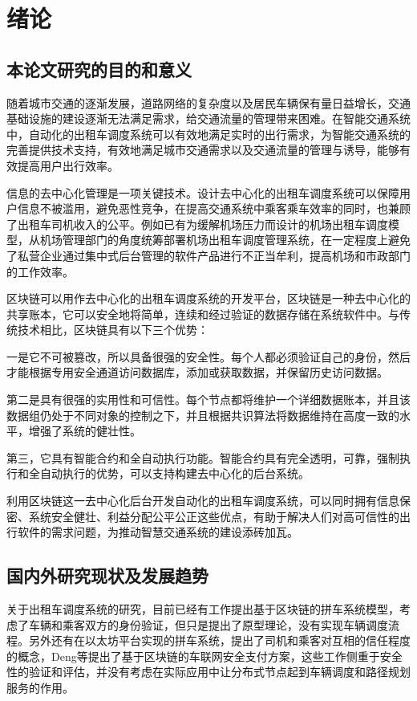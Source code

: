 \chapter{绪论}
\section{本论文研究的目的和意义}

随着城市交通的逐渐发展，道路网络的复杂度以及居民车辆保有量日益增长，交通基础设施的建设逐渐无法满足需求，给交通流量的管理带来困难。在智能交通系统中，自动化的出租车调度系统可以有效地满足实时的出行需求，为智能交通系统的完善提供技术支持，有效地满足城市交通需求以及交通流量的管理与诱导，能够有效提高用户出行效率。

信息的去中心化管理是一项关键技术。设计去中心化的出租车调度系统可以保障用户信息不被滥用，避免恶性竞争，在提高交通系统中乘客乘车效率的同时，也兼顾了出租车司机收入的公平。例如已有为缓解机场压力而设计的机场出租车调度模型，从机场管理部门的角度统筹部署机场出租车调度管理系统，在一定程度上避免了私营企业通过集中式后台管理的软件产品进行不正当牟利，提高机场和市政部门的工作效率。

区块链可以用作去中心化的出租车调度系统的开发平台，区块链是一种去中心化的共享账本，它可以安全地将简单，连续和经过验证的数据存储在系统软件中。与传统技术相比，区块链具有以下三个优势：

一是它不可被篡改，所以具备很强的安全性。每个人都必须验证自己的身份，然后才能根据专用安全通道访问数据库，添加或获取数据，并保留历史访问数据。

第二是具有很强的实用性和可信性。每个节点都将维护一个详细数据账本，并且该数据组仍处于不同对象的控制之下，并且根据共识算法将数据维持在高度一致的水平，增强了系统的健壮性。

第三，它具有智能合约和全自动执行功能。智能合约具有完全透明，可靠，强制执行和全自动执行的优势，可以支持构建去中心化的后台系统。

利用区块链这一去中心化后台开发自动化的出租车调度系统，可以同时拥有信息保密、系统安全健壮、利益分配公平公正这些优点，有助于解决人们对高可信性的出行软件的需求问题，为推动智慧交通系统的建设添砖加瓦。


\section{国内外研究现状及发展趋势}
关于出租车调度系统的研究，目前已经有工作提出基于区块链的拼车系统模型，考虑了车辆和乘客双方的身份验证，但只是提出了原型理论，没有实现车辆调度流程。另外还有在以太坊平台实现的拼车系统，提出了司机和乘客对互相的信任程度的概念，Deng等提出了基于区块链的车联网安全支付方案，这些工作侧重于安全性的验证和评估，并没有考虑在实际应用中让分布式节点起到车辆调度和路径规划服务的作用。

